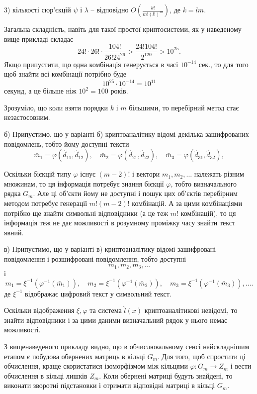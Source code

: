 \documentclass{ceurart}
\begin{document}
     3) кількості сюр'єкцій \(\psi\) і \(\lambda\) -- відповідно
        \(O(\frac{k!}{m!(l!)^m})\), де \(k=lm\).

Загальна складність, навіть для такої простої криптосистеми, як у
наведеному вище прикладі складає
\[24!\cdot 26!\cdot \frac{104!}{26!24^{26}}>\frac{24!104!}{2^{120}}
 > 10^{25}.\]
Якщо припустити, що одна комбінація генерується в часі \(10^{-14}\)
сек., то для того щоб знайти всі комбінації потрібно буде
     \[10^{25}\cdot 10^{-14}=10^{11}\]
секунд, а це більше ніж \(10^{2}=100\) років.

Зрозуміло, що коли взяти порядки \(k\) і \(m\) більшими, то перебірний
метод стає незастосовним.

б) Припустимо, що у варіанті б) криптоаналітику відомі декілька
зашифрованих повідомлень, тобто йому доступні тексти
\[
 \bar m_1=\varphi(\hat d_{11},\hat d_{12}), \quad \bar m_2=\varphi(\hat
d_{21},\hat d_{22}), \quad
\bar m_3=\varphi(\hat d_{31},\hat d_{32}),
\]

Оскільки бієкцій
типу \(\varphi\) існує \((m-2)!\) і вектори \(m_1,m_2,\ldots\) належать різним
множинам, то ця інформація потребує знання бієкції \(\varphi\), тобто визначального
рядка \(G_m\). Але ці об'єкти йому не доступні і пошук цих об'єктів
перебірним
методом потребує генерації \(m!(m-2)!\) комбінацій. А за цими
комбінаціями потрібно ще знайти символьні відповідники (а це теж
\(m!\) комбінацій), то ця інформація теж не дає можливості в розумному
проміжку часу знайти текст явний.

в) Припустимо, що у варіанті в) криптоаналітику відомі зашифровані
повідомлення і розшифровані повідомлення, тобто доступні
\[
 m_1, m_2, m_3, \ldots
\]
і
\[
 m_1=\xi^{-1}(\varphi^{-1}(\bar m_1)), \quad
  m_2=\xi^{-1}(\varphi^{-1}(\bar m_2)), \quad
  m_3=\xi^{-1}(\varphi^{-1}(\bar m_3)), \ldots.
\]
де \(\xi^{-1}\) відображає цифровий текст у символьний текст.

Оскільки відображення \(\xi, \varphi\) та система \(\hat l(x)\)
криптоаналітикові невідомі, то знайти відповідники і за цими
даними визначальний рядок у нього немає можливості.

З вищенаведеного прикладу видно, що в обчислювальному сенсі найскладнішим
етапом є побудова обернених матриць в кільці \(G_m\). Для того, щоб
спростити ці обчислення, краще скористатися ізоморфізмом між
кільцями \(\varphi : G_m \to Z_m\) і вести обчислення в кільці лишків
\(Z_m\). Коли обернені матриці будуть знайдені, то виконати зворотні
підстановки і отримати відповідні матриці в кільці \(G_m\).
\end{document}
